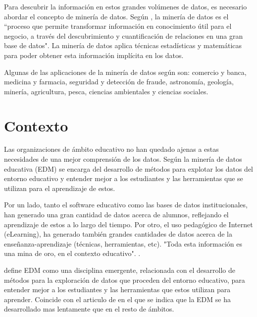 Para descubrir la información en estos grandes volúmenes de datos, es necesario abordar el concepto de minería de datos.  Según , la minería de datos es el ``proceso que permite transformar información en conocimiento útil para el
negocio, a través del descubrimiento y cuantificación de relaciones en una
gran base de datos". La minería de datos aplica técnicas estadísticas y matemáticas para poder obtener esta información implícita en los datos.

Algunas de las aplicaciones de la minería de datos según \cite{riquelme2006mineria} son:  comercio y banca, medicina y farmacia, seguridad y detección de fraude, astronomía, geología, minería, agricultura, pesca, ciencias ambientales y ciencias sociales.


\section{Contexto}
Las organizaciones de ámbito educativo no han quedado ajenas a estas necesidades de una mejor comprensión de los datos. Según  la minería de datos educativa (EDM) se encarga del desarrollo de métodos para explotar los datos del entorno educativo y entender mejor a los estudiantes y las herramientas que se utilizan para el aprendizaje de estos.

Por un lado, tanto el software educativo como las bases de datos institucionales, han generado una gran cantidad de datos acerca de alumnos, reflejando el aprendizaje de estos a lo largo del tiempo. Por otro, el uso pedagógico de Internet (eLearning), ha generado también grandes cantidades de datos acerca de la enseñanza-aprendizaje (técnicas, herramientas, etc). "Toda esta información es una mina de oro, en el contexto educativo". \cite{romero2010educational}.

 define EDM como una disciplina emergente, relacionada con el desarrollo de métodos para la exploración  de datos que proceden del entorno educativo, para entender mejor a los estudiantes y las herramientas que estos utilizan para aprender. Coincide con el articulo de \cite{inbook} en el que se indica que la EDM se ha desarrollado mas lentamente que en el resto de ámbitos.

